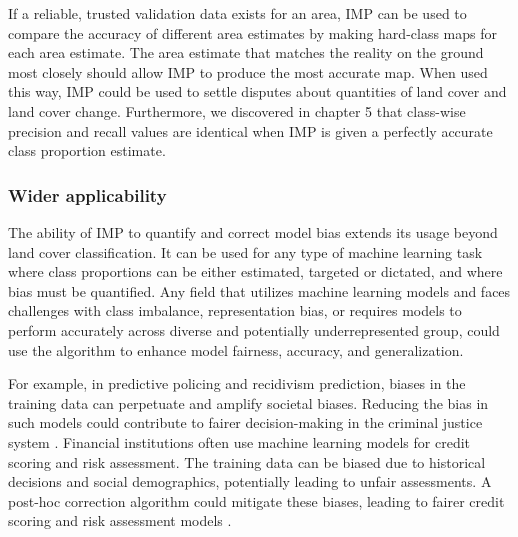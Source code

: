         If a reliable, trusted validation data exists for an area, IMP can be used to compare the accuracy of different area estimates by making hard-class maps for each area estimate. The area estimate that matches the reality on the ground most closely should allow IMP to produce the most accurate map. When used this way, IMP could be used to settle disputes about quantities of land cover and land cover change. Furthermore, we discovered in chapter 5 that class-wise precision and recall values are identical when IMP is given a perfectly accurate class proportion estimate. 

        \subsubsection{Wider applicability}
        
        The ability of IMP to quantify and correct model bias extends its usage beyond land cover classification. It can be used for any type of machine learning task where class proportions can be either estimated, targeted or dictated, and where bias must be quantified. Any field that utilizes machine learning models and faces challenges with class imbalance, representation bias, or requires models to perform accurately across diverse and potentially underrepresented group, could use the algorithm to enhance model fairness, accuracy, and generalization. 
            
        For example, in predictive policing and recidivism prediction, biases in the training data can perpetuate and amplify societal biases. Reducing the bias in such models could contribute to fairer decision-making in the criminal justice system \citep{berk2021fairness, dressel2018accuracy}. Financial institutions often use machine learning models for credit scoring and risk assessment. The training data can be biased due to historical decisions and social demographics, potentially leading to unfair assessments. A post-hoc correction algorithm could mitigate these biases, leading to fairer credit scoring and risk assessment models \citep{chen2018why, kamiran2012data}. 
    

    
